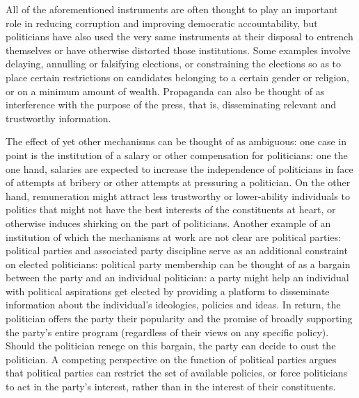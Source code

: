 \documentclass[12pt]{article}
\begin{document}
All of the aforementioned instruments are often thought to play an important role in reducing corruption and improving democratic accountability, but politicians have also used the very same instruments at their disposal to entrench themselves or have otherwise distorted those institutions. Some examples involve delaying, annulling or falsifying elections, or constraining the elections so as to place certain restrictions on candidates belonging to a certain gender or religion, or on a minimum amount of wealth. Propaganda can also be thought of as interference with the purpose of the press, that is, disseminating relevant and trustworthy information. 

The effect of yet other mechanisms can be thought of as ambiguous: one case in point is the institution of a salary or other compensation for politicians: one the one hand, salaries are expected to increase the independence of politicians in face of attempts at bribery or other attempts at pressuring a politician. On the other hand, remuneration might attract less trustworthy or lower-ability individuals to politics that might not have the best interests of the constituents at heart, or otherwise induces shirking on the part of politicians. Another example of an institution of which the mechanisms at work are not clear are political parties: political parties and associated party discipline serve as an additional constraint on elected politicians: political party membership can be thought of as a bargain between the party and an individual politician: a party might help an individual with political aspirations get elected by providing a platform to disseminate information about the individual's ideologies, policies and ideas. In return, the politician offers the party their popularity and the promise of broadly supporting the party's entire program (regardless of their views on any specific policy). Should the politician renege on this bargain, the party can decide to oust the politician. A competing perspective on the function of political parties argues that political parties can restrict the set of available policies, or force politicians to act in the party's interest, rather than in the interest of their constituents. 
\end{document}
